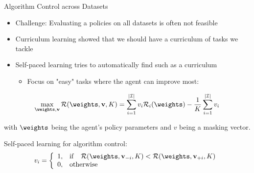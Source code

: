 \begin{frame}[c]{Algorithm Control across Datasets }
	
	\begin{itemize}
		\item Challenge: Evaluating a policies on all datasets is often not feasible
		\item Curriculum learning  showed that we should have a curriculum of tasks we tackle
		\item Self-paced learning  tries to automatically find such as a curriculum
		\begin{itemize}
			\item Focus on "easy" tasks where the agent can improve most:
		\end{itemize}
	\end{itemize}
	
\begin{equation} 
\label{spl_loss}
\max_{\weights,\vec{v}}\mathcal{R}(\weights, \vec{v}, K) = \sum^{|\insts|}_{i=1} v_i\mathcal{R}_i(\weights) - \frac{1}{K} \sum^{|\insts|}_{i=1} v_i \nonumber
\end{equation}

with $\weights$ being the agent's policy parameters and $v$ being a masking vector.

\pause
\medskip

Self-paced learning for algorithm control:
\begin{equation}
v_i = \left\{
\begin{array}{ll}
1, &  \mathrm{if}\quad\mathcal{R}(\weights, \vec{v}_{-i}, K) < \mathcal{R}(\weights, \vec{v}_{+i}, K)\\
0, & \mathrm{otherwise}
\end{array}
\right.\nonumber
\end{equation}
\end{frame}


